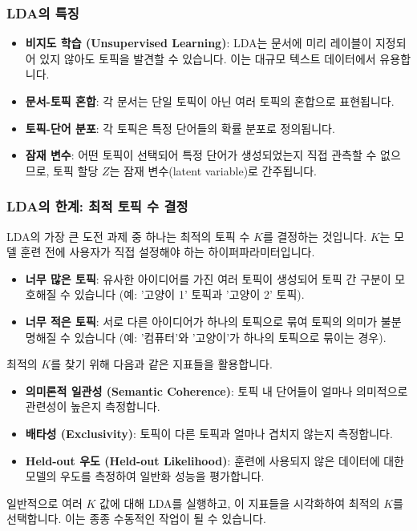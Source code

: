 \documentclass[11pt,a4paper]{article}
\begin{document}
\subsubsection{LDA의 특징}
\begin{itemize}
    \item \textbf{비지도 학습 (Unsupervised Learning)}: LDA는 문서에 미리 레이블이 지정되어 있지 않아도 토픽을 발견할 수 있습니다. 이는 대규모 텍스트 데이터에서 유용합니다.
    \item \textbf{문서-토픽 혼합}: 각 문서는 단일 토픽이 아닌 여러 토픽의 혼합으로 표현됩니다.
    \item \textbf{토픽-단어 분포}: 각 토픽은 특정 단어들의 확률 분포로 정의됩니다.
    \item \textbf{잠재 변수}: 어떤 토픽이 선택되어 특정 단어가 생성되었는지 직접 관측할 수 없으므로, 토픽 할당 $Z$는 잠재 변수(latent variable)로 간주됩니다.
\end{itemize}

\subsubsection{LDA의 한계: 최적 토픽 수 결정}
LDA의 가장 큰 도전 과제 중 하나는 최적의 토픽 수 $K$를 결정하는 것입니다. $K$는 모델 훈련 전에 사용자가 직접 설정해야 하는 하이퍼파라미터입니다.

\begin{itemize}
    \item \textbf{너무 많은 토픽}: 유사한 아이디어를 가진 여러 토픽이 생성되어 토픽 간 구분이 모호해질 수 있습니다 (예: '고양이 1' 토픽과 '고양이 2' 토픽).
    \item \textbf{너무 적은 토픽}: 서로 다른 아이디어가 하나의 토픽으로 묶여 토픽의 의미가 불분명해질 수 있습니다 (예: '컴퓨터'와 '고양이'가 하나의 토픽으로 묶이는 경우).
\end{itemize}

최적의 $K$를 찾기 위해 다음과 같은 지표들을 활용합니다.
\begin{itemize}
    \item \textbf{의미론적 일관성 (Semantic Coherence)}: 토픽 내 단어들이 얼마나 의미적으로 관련성이 높은지 측정합니다.
    \item \textbf{배타성 (Exclusivity)}: 토픽이 다른 토픽과 얼마나 겹치지 않는지 측정합니다.
    \item \textbf{Held-out 우도 (Held-out Likelihood)}: 훈련에 사용되지 않은 데이터에 대한 모델의 우도를 측정하여 일반화 성능을 평가합니다.
\end{itemize}
일반적으로 여러 $K$ 값에 대해 LDA를 실행하고, 이 지표들을 시각화하여 최적의 $K$를 선택합니다. 이는 종종 수동적인 작업이 될 수 있습니다.
\end{document}
